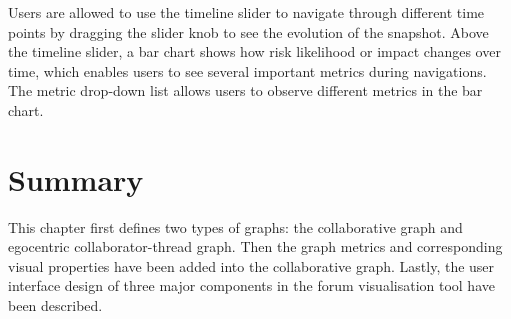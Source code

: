 Users are allowed to use the timeline slider to navigate through different time points by dragging the slider knob to see the evolution of the snapshot. Above the timeline slider, a bar chart shows how risk likelihood or impact changes over time, which enables users to see several important metrics during navigations. The metric drop-down list allows users to observe different metrics in the bar chart.

\section{Summary}
This chapter first defines two types of graphs: the collaborative graph and egocentric collaborator-thread graph. Then the graph metrics and corresponding visual properties have been added into the collaborative graph. Lastly, the user interface design of three major components in the forum visualisation tool have been described.
